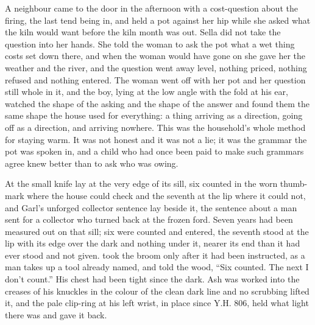 \scenebreak

A neighbour came to the door in the afternoon with a cost-question about the firing, the last tend being in, and held a pot against her hip while she asked what the kiln would want before the kiln month was out. Sella did not take the question into her hands. She told the woman to ask the pot what a wet thing costs set down there, and when the woman would have gone on she gave her the weather and the river, and the question went away level, nothing priced, nothing refused and nothing entered. The woman went off with her pot and her question still whole in it, and the boy, lying at the low angle with the fold at his ear, watched the shape of the asking and the shape of the answer and found them the same shape the house used for everything: a thing arriving as a direction, going off as a direction, and arriving nowhere. This was the household's whole method for staying warm. It was not honest and it was not a lie; it was the grammar the pot was spoken in, and a child who had once been paid to make such grammars agree knew better than to ask who was owing.

\scenebreak

At  the small knife lay at the very edge of its sill, six counted in the worn thumb-mark where the house could check and the seventh at the lip where it could not, and Garl's unforged collector sentence lay beside it, the sentence about a man sent for a collector who turned back at the frozen ford. Seven years had been measured out on that sill; six were counted and entered, the seventh stood at the lip with its edge over the dark and nothing under it, nearer its end than it had ever stood and not given.  took the broom only after it had been instructed, as a man takes up a tool already named, and told the wood, “Six counted. The next I don't count.” His chest had been tight since the dark. Ash was worked into the creases of his knuckles in the colour of the clean dark line and no scrubbing lifted it, and the pale clip-ring at his left wrist, in place since Y.H. 806, held what light there was and gave it back.

